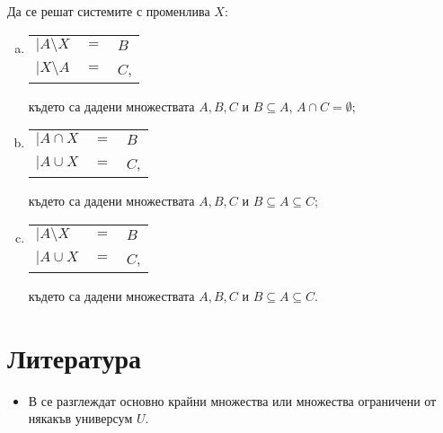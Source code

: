 \begin{problem}
  Да се решат системите с променлива $X$:
  \begin{enumerate}[a)]
  \item
    \begin{tabular}{l c l}
      $\big|A\setminus X$ & $= $ & $ B$\\
      $\big|X\setminus A $ & $=$ & $ C$,
    \end{tabular}
    
    където са дадени множествата $A,B,C$ и $B\subseteq A$, $A\cap C = \emptyset$;
  \item
    \begin{tabular}{l c l}
      $\big|A\cap X$ & $= $ & $ B$\\
      $\big|A\cup X $ & $=$ & $ C$,
    \end{tabular}
    
    където са дадени множествата $A,B,C$ и $B\subseteq A\subseteq C$;
  \item
    \begin{tabular}{l c l}
      $\big|A\setminus X$ & $= $ & $ B$\\
      $\big|A\cup X $ & $=$ & $ C$,
    \end{tabular}

    където са дадени множествата $A,B,C$ и $B\subseteq A\subseteq C$.

  \end{enumerate}
\end{problem}

\section*{Литература}

\begin{itemize}
\item 
  В \cite[Глава 2]{rosen} се разглеждат основно крайни множества или 
  множества ограничени от някакъв универсум $U$.
\end{itemize}



